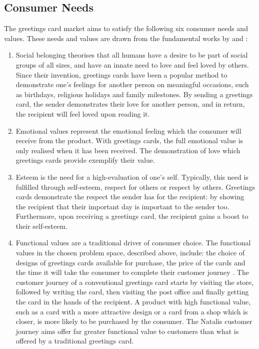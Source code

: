 \documentclass[10pt,a4paper]{article}
\begin{document}
\subsection*{Consumer Needs}
The greetings card market aims to satisfy the following six consumer needs and values. These needs and values are drawn from the fundamental works by \citet{maslow1943theory} and \citet{sheth1991we}:
\begin{enumerate}
  \item Social belonging theorises that all humans have a desire to be part of social groups of all sizes, and have an innate need to love and feel loved by others. Since their invention, greetings cards have been a popular method to demonstrate one's feelings for another person on meaningful occasions, such as birthdays, religious holidays and family milestones. By sending a greetings card, the sender demonstrates their love for another person, and in return, the recipient will feel loved upon reading it.
  \item Emotional values represent the emotional feeling which the consumer will receive from the product. With greetings cards, the full emotional value is only realised when it has been received. The demonstration of love which greetings cards provide exemplify their value.
  \item Esteem is the need for a high-evaluation of one's self. Typically, this need is fulfilled through self-esteem, respect for others or respect by others. Greetings cards demonstrate the respect the sender has for the recipient: by showing the recipient that their important day is important to the sender too. Furthermore, upon receiving a greetings card, the recipient gains a boost to their self-esteem.
  \item Functional values are a traditional driver of consumer choice. The functional values in the chosen problem space, described above, include: the choice of designs of greetings cards available for purchase, the price of the cards and the time it will take the consumer to complete their customer journey \citep{edelman2015competing}. The customer journey of a conventional greetings card starts by visiting the store, followed by writing the card, then visiting the post office and finally getting the card in the hands of the recipient. A product with high functional value, such as a card with a more attractive design or a card from a shop which is closer, is more likely to be purchased by the consumer. The Natalis customer journey aims offer far greater functional value to customers than what is offered by a traditional greetings card.

\end{enumerate}
\end{document}
